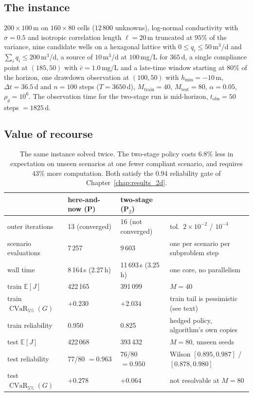 \documentclass[11pt]{article}
\newcommand{\E}{\mathbb{E}}
\newcommand{\CVaR}{\operatorname{CVaR}}
\begin{document}
\subsection{The instance}
\label{sec:appx-bench}

$200\times100$\,m on $160\times80$ cells ($12\,800$ unknowns), log-normal
conductivity with $\sigma=0.5$ and isotropic correlation length
$\ell=20$\,m truncated at $95\%$ of the variance, nine candidate wells on a
hexagonal lattice with $0\le q_i\le50$\,m$^3$/d and
$\sum_i q_i\le200$\,m$^3$/d, a source of $10$\,m$^3$/d at $100$\,mg/L for
$365$\,d, a single compliance point at $(185,50)$ with $\bar c=1.0$\,mg/L and a
late-time window starting at $80\%$ of the horizon, one drawdown observation at
$(100,50)$ with $h_{\min}=-10$\,m, $\Delta t=36.5$\,d and $n=100$ steps
($T=3650$\,d), $M_{\text{train}}=40$, $M_{\text{test}}=80$,
$\alpha=0.05$, $\rho_g=10^6$. The observation time for the two-stage run is
mid-horizon, $t_{\mathrm{obs}}=50$ steps $=1825$\,d.

\subsection{Value of recourse}

\begin{table}[t]
\centering
\small
\begin{tabularx}{\textwidth}{@{}l l l X@{}}
\toprule
 & here-and-now (P) & two-stage (P$_2$) & \\
\midrule
outer iterations & 13 (converged) & 16 (not converged) & tol.\ $2\times10^{-2}$ / $10^{-3}$ \\
scenario evaluations & 7\,257 & 9\,603 & one per scenario per subproblem step \\
wall time & 8\,164\,s (2.27\,h) & 11\,693\,s (3.25\,h) & one core, no parallelism \\
\midrule
train $\E[J]$ & 422\,165 & 391\,099 & $M=40$ \\
train $\CVaR_{5\%}(G)$ & $+0.230$ & $+2.034$ & train tail is pessimistic (see text) \\
train reliability & 0.950 & 0.825 & hedged policy, algorithm's own copies \\
\midrule
test $\E[J]$ & 422\,068 & 393\,432 & $M=80$, unseen seeds \\
test reliability & 77/80 $=0.963$ & 76/80 $=0.950$ & Wilson $[0.895,0.987]$ / $[0.878,0.980]$ \\
test $\CVaR_{5\%}(G)$ & $+0.278$ & $+0.064$ & not resolvable at $M=80$ \\
\bottomrule
\end{tabularx}
\caption{The same instance solved twice. The two-stage policy costs $6.8\%$ less
in expectation on unseen scenarios at one fewer compliant scenario, and requires
$43\%$ more computation. Both satisfy the $0.94$ reliability gate of
Chapter~\ref{chap:results_2d}.}
\label{tab:appx-bench}
\end{table}
\end{document}

